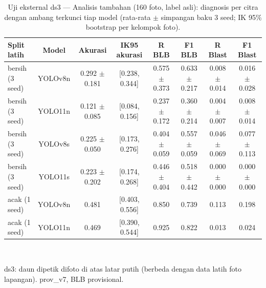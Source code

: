 \begin{table}[!t]
\centering
\caption{Uji eksternal ds3 — Analisis tambahan (160 foto, label asli): diagnosis per citra dengan ambang terkunci tiap model (rata-rata $\pm$ simpangan baku 3 seed; IK 95\% bootstrap per kelompok foto).}
\label{tab:ds3_tambahan}
\footnotesize
\begin{tabular}{lccccccc}
\hline
\textbf{Split latih} & \textbf{Model} & \textbf{Akurasi} & \textbf{IK95 akurasi} & \textbf{R BLB} & \textbf{F1 BLB} & \textbf{R Blast} & \textbf{F1 Blast} \\
\hline
bersih (3 seed) & YOLOv8n & 0.292 $\pm$ 0.181 & [0.238, 0.344] & 0.575 $\pm$ 0.373 & 0.633 $\pm$ 0.217 & 0.008 $\pm$ 0.014 & 0.016 $\pm$ 0.028 \\
bersih (3 seed) & YOLO11n & 0.121 $\pm$ 0.085 & [0.084, 0.156] & 0.237 $\pm$ 0.172 & 0.360 $\pm$ 0.214 & 0.004 $\pm$ 0.007 & 0.008 $\pm$ 0.014 \\
bersih (3 seed) & YOLOv8s & 0.225 $\pm$ 0.050 & [0.173, 0.276] & 0.404 $\pm$ 0.059 & 0.557 $\pm$ 0.059 & 0.046 $\pm$ 0.069 & 0.077 $\pm$ 0.113 \\
bersih (3 seed) & YOLO11s & 0.223 $\pm$ 0.202 & [0.174, 0.268] & 0.446 $\pm$ 0.404 & 0.518 $\pm$ 0.442 & 0.000 $\pm$ 0.000 & 0.000 $\pm$ 0.000 \\
acak (1 seed) & YOLOv8n & 0.481 & [0.403, 0.556] & 0.850 & 0.739 & 0.113 & 0.198 \\
acak (1 seed) & YOLO11n & 0.469 & [0.390, 0.544] & 0.925 & 0.822 & 0.013 & 0.024 \\
\hline
\end{tabular}
\\[2pt]\parbox{\columnwidth}{\scriptsize ds3: daun dipetik difoto di atas latar putih (berbeda dengan data latih foto lapangan). prov\_v7, BLB provisional.}
\end{table}

